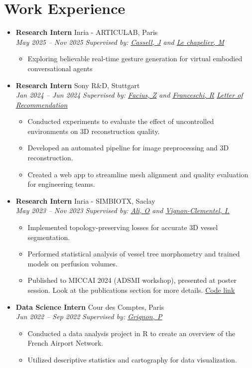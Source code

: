 \documentclass[letterpaper,11pt,twocolumn]{article}
\newcommand{\resumeItem}[1]{\item \small{#1}}
\newcommand{\resumeSubheading}[4]{
	\vspace{-2pt}\item \textbf{#1} \hfill #2 \\
	\textit{\small #3} \hfill \textit{\small #4} 
	\vspace{-7pt}
}
\newcommand{\resumeItemListStart}{\begin{itemize}[leftmargin=*]}
\newcommand{\resumeItemListEnd}{\end{itemize}\vspace{-5pt}}
\begin{document}
	\section{Work Experience}
	\begin{itemize}[leftmargin=*]
		\resumeSubheading
		{Research Intern}{Inria - ARTICULAB, Paris}{May 2025 -- Nov 2025}{\textit{Supervised by: \href{https://scholar.google.com/citations?user=wkC9xHMAAAAJ&hl=en}{\underline{Cassell, J}} and \href{https://fr.linkedin.com/in/marius-le-chapelier-7694b5172}{\underline{Le chapelier, M}}}} 
	
	\resumeItemListStart
	\resumeItem{Exploring believable real-time gesture generation for virtual embodied conversational agents}
	\resumeItemListEnd
	
	\resumeSubheading
	{Research Intern}{Sony R\&D, Stuttgart}{Jan 2024 -- Jun 2024}{\textit{Supervised by: \href{https://de.linkedin.com/in/zoltan-facius-6b424112}{\underline{Facius, Z}} and \href{https://de.linkedin.com/in/roberto-franceschi}{\underline{Franceschi, R}}} \vspace{5pt} \href{https://machtayassine.github.io/resume/Sony_LoR.pdf}{\underline{\textit{Letter of Recommendation}}}}
	
	\resumeItemListStart
	\resumeItem{Conducted experiments to evaluate the effect of uncontrolled environments on 3D reconstruction quality.}
	\resumeItem{Developed an automated pipeline for image preprocessing and 3D reconstruction.}
	\resumeItem{Created a web app to streamline mesh alignment and quality evaluation for engineering teams.}
	\resumeItemListEnd
	
	\resumeSubheading
	{Research Intern}{Inria - SIMBIOTX, Saclay}{May 2023 -- Nov 2023}{\textit{Supervised by: \href{https://scholar.google.com/citations?user=tKRo0ewAAAAJ&hl=en}{\underline{Ali, O}} and \href{https://team.inria.fr/simbiotx/team-members/irene-vignon-clementel/}{\underline{Vignon-Clementel, I.}}}}
	
	\resumeItemListStart
	\resumeItem{Implemented topology-preserving losses for accurate 3D vessel segmentation.}
	\resumeItem{Performed statistical analysis of vessel tree morphometry and trained models on perfusion volumes.}
	\resumeItem{Published to MICCAI 2024 (ADSMI workshop), presented at poster session. Look at the publications section for more details.} \underline{\href{https://gitlab.inria.fr/simbiotx/LiverVesselSeg}{Code link}}
	\resumeItemListEnd
	
	\resumeSubheading
	{Data Science Intern}{Cour des Comptes, Paris}{Jun 2022 -- Sep 2022}{\textit{Supervised by: \href{https://fr.linkedin.com/in/paulgrignon}{\underline{Grignon, P}}}}
	
	\resumeItemListStart
	\resumeItem{Conducted a data analysis project in R to create an overview of the French Airport Network.}
	\resumeItem{Utilized descriptive statistics and cartography for data visualization.}
	\resumeItemListEnd
\end{itemize}
\end{document}
